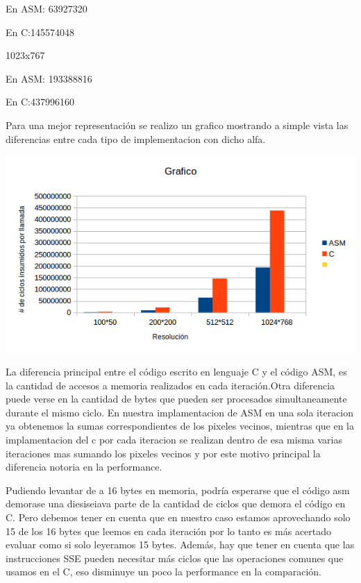 En ASM: 63927320

En C:145574048

 \vspace*{0.3cm} \noindent
1023x767

En ASM: 193388816

En C:437996160


  
  \vspace*{0.3cm}

 Para una mejor representación se realizo un grafico mostrando a simple vista
 las diferencias entre cada tipo de implementacion con dicho alfa.
 \vspace*{0.3cm} \vspace*{0.3cm}
  \begin{center}
 \includegraphics[scale=1]{ldr-.png}
 \end{center}
  \vspace*{0.3cm} 
  
  
La diferencia principal entre el c\'odigo escrito en lenguaje C y el c\'odigo ASM, es la cantidad de accesos 
a memoria realizados en cada iteraci\'on.Otra diferencia puede verse en la cantidad de bytes que pueden 
ser procesados simultaneamente durante el mismo ciclo. En nuestra implamentacion de ASM en una sola iteracion ya
obtenemos la sumas correspondientes de los pixeles vecinos, mientras que en la implamentacion del c por cada iteracion
se realizan dentro de esa misma varias iteraciones mas sumando los pixeles vecinos y por este motivo principal
la diferencia notoria en la performance.\vspace*{0.2cm}

Pudiendo levantar de a 16 bytes en memoria, podr\'ia esperarse que el c\'odigo asm demorase una 
diesiseiava parte de la cantidad de ciclos que demora el c\'odigo en C.
Pero debemos tener en cuenta que en nuestro caso estamos aprovechando solo 15 de los 16 bytes que leemos 
en cada iteraci\'on por lo tanto es más acertado evaluar como si solo leyeramos 15 bytes. 
Adem\'as, hay que tener en cuenta que las instrucciones SSE pueden necesitar más ciclos que las operaciones 
comunes que usamos en el C, eso disminuye un poco la performance en la comparación. 
\vspace*{0.3cm} \vspace*{0.3cm} 
